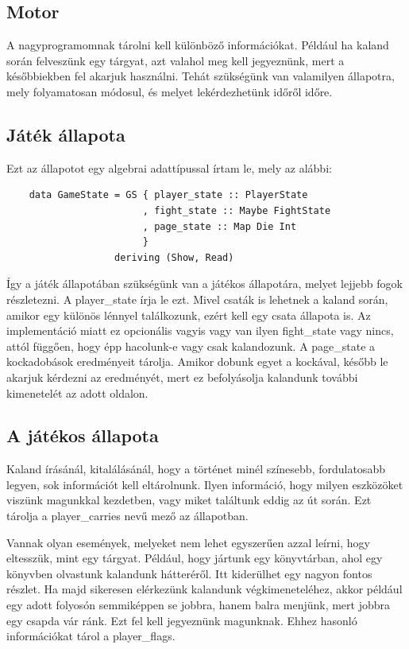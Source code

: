 \documentclass[12pt,a4paper,oneside]{report}
\newcommand{\xstate}[1]{{\color{State}#1}}
\begin{document}
    \subsection{Motor}
    A nagyprogramomnak tárolni kell különböző információkat. Például ha
    kaland során felveszünk egy tárgyat, azt valahol meg kell jegyeznünk, mert a
    későbbiekben fel akarjuk használni. Tehát szükségünk van valamilyen
    állapotra, mely folyamatosan módosul, és melyet lekérdezhetünk
    időről időre.
    \subsection{Játék állapota}
    Ezt az állapotot egy algebrai adattípussal írtam le, mely az
    alábbi:
    \begin{verbatim}
    data GameState = GS { player_state :: PlayerState
                        , fight_state :: Maybe FightState
                        , page_state :: Map Die Int
                        }
                   deriving (Show, Read)
    \end{verbatim}
    Így a játék állapotában szükségünk van a játékos állapotára,
    melyet lejjebb fogok részletezni. A \xstate{player\_state} írja le
    ezt. Mivel csaták is lehetnek a kaland során, amikor egy különös
    lénnyel találkozunk, ezért kell egy csata állapota is. Az
    implementáció miatt ez opcionális vagyis vagy van ilyen
    \xstate{fight\_state} vagy nincs, attól függően, hogy épp hacolunk-e vagy
    csak kalandozunk. A \xstate{page\_state} a kockadobások eredményeit
    tárolja. Amikor dobunk egyet a kockával, később le akarjuk
    kérdezni az eredményét, mert ez befolyásolja kalandunk további
    kimenetelét az adott oldalon.
    
    \subsection{A játékos állapota}
    Kaland írásánál, kitalálásánál, hogy a történet minél színesebb,
    fordulatosabb legyen, sok információt kell eltárolnunk. Ilyen
    információ, hogy milyen eszközöket viszünk magunkkal kezdetben,
    vagy miket találtunk eddig az út során.  Ezt tárolja a
    \xstate{player\_carries} nevű mező az állapotban.

    Vannak olyan események, melyeket nem lehet egyszerűen azzal
    leírni, hogy eltesszük, mint egy tárgyat. Például, hogy jártunk
    egy könyvtárban, ahol egy könyvben olvastunk kalandunk hátteréről.
    Itt kiderülhet egy nagyon fontos részlet. Ha majd sikeresen elérkezünk
    kalandunk végkimeneteléhez, akkor például egy adott folyosón
    semmiképpen se jobbra, hanem balra menjünk, mert jobbra egy csapda
    vár ránk. Ezt fel kell jegyeznünk magunknak. Ehhez hasonló
    információkat tárol a \xstate{player\_flags}.
\end{document}
